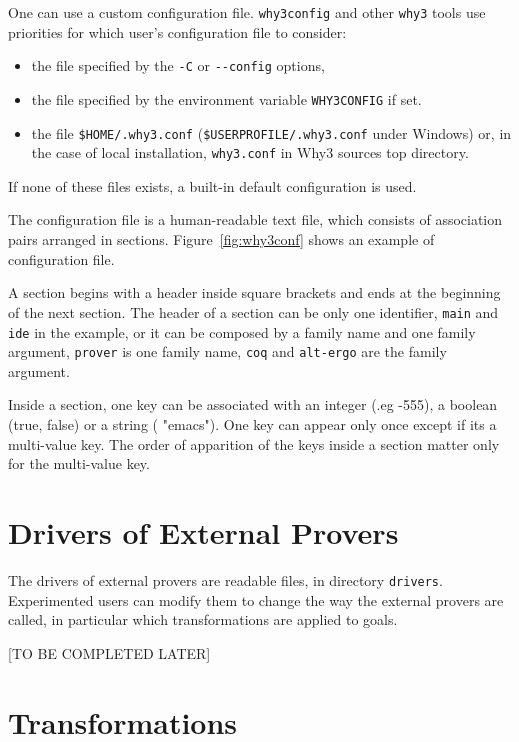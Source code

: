 One can use a custom configuration file. \texttt{why3config}
and other \texttt{why3} tools use priorities for which
user's configuration file to consider:
\begin{itemize}
\item the file specified by the \texttt{-C} or \texttt{-{}-config} options,
\item the file specified by the environment variable
  \texttt{WHY3CONFIG} if set.
\item the file \texttt{\$HOME/.why3.conf}
  (\texttt{\$USERPROFILE/.why3.conf} under Windows) or, in the case of
  local installation, \texttt{why3.conf} in Why3 sources top directory.
\end{itemize}
If none of these files exists, a built-in default configuration is used.

The configuration file is a human-readable text file, which consists
of association pairs arranged in sections. Figure~\ref{fig:why3conf}
shows an example of configuration file.

A section begins with a header inside square brackets and ends at the
beginning of the next section. The header of a
section can be only one identifier, \texttt{main} and \texttt{ide} in
the example, or it can be composed by a family name and one family
argument, \texttt{prover} is one family name, \texttt{coq} and
\texttt{alt-ergo} are the family argument.

Inside a section, one key can be associated with an integer (.eg -555),
a boolean (true, false) or a string (\eg{} "emacs"). One key can appear
only once except if its a multi-value key. The order of apparition of
the keys inside a section matter only for the multi-value key.

\section{Drivers of External Provers}
\label{sec:drivers}

The drivers of external provers are readable files, in directory
\texttt{drivers}. Experimented users can modify them to change the way
the external provers are called, in particular which transformations
are applied to goals.

[TO BE COMPLETED LATER]

\section{Transformations}
\label{sec:transformations}

